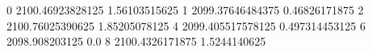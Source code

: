 0 2100.46923828125 1.56103515625
1 2099.37646484375 0.46826171875
2 2100.76025390625 1.85205078125
4 2099.405517578125 0.497314453125
6 2098.908203125 0.0
8 2100.4326171875 1.5244140625

